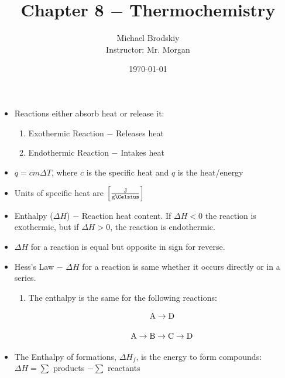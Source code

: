 \documentclass[12pt]{article}
\title{Chapter 8 $-$ Thermochemistry}
\date{\today}
\author{Michael Brodskiy\\ \small Instructor: Mr. Morgan}
\begin{document}
\maketitle

\begin{itemize}

  \item Reactions either absorb heat or release it:

    \begin{enumerate}

      \item Exothermic Reaction $-$ Releases heat

      \item Endothermic Reaction $-$ Intakes heat

    \end{enumerate}

  \item $q=cm\Delta T$, where $c$ is the specific heat and $q$ is the heat/energy
    
  \item Units of specific heat are $\left[ \frac{\si{\joule}}{\si{\gram\Celsius}} \right]$

  \item Enthalpy ($\Delta H$) $-$ Reaction heat content. If $\Delta H<0$ the reaction is exothermic, but if $\Delta H>0$, the reaction is endothermic.

  \item $\Delta H$ for a reaction is equal but opposite in sign for reverse.

  \item Hess's Law $-$ $\Delta H$ for a reaction is same whether it occurs directly or in a series.

    \begin{enumerate}

      \item The enthalpy is the same for the following reactions:

        $$\ce{A}\rightarrow\ce{D}$$

        $$\ce{A}\rightarrow\ce{B}\rightarrow\ce{C}\rightarrow\ce{D}$$

    \end{enumerate}

  \item The Enthalpy of formations, $\Delta H_f$, is the energy to form compounds: $\Delta H=\sum$ products $-\sum$ reactants

    \begin{enumerate}


\end{enumerate}
\end{itemize}
\end{document}
